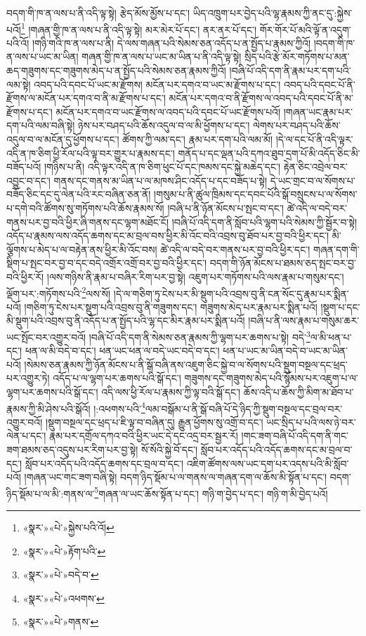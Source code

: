 བདག་གི་ཁ་ན་ལས་པ་ནི་འདི་ལྟ་སྟེ། རྩེད་མོས་མྱོས་པ་དང་། ཡིད་འཁྲུག་པར་བྱེད་པའི་ལྷ་རྣམས་ཀྱི་ནང་དུ་:སྐྱེས་པའོ།\footnote{«སྣར་»«པེ་»སྐྱེས་པའི་འོ།} །གཞན་གྱི་ཁ་ན་ལས་པ་ནི་འདི་ལྟ་སྟེ། མར་མེར་པོ་དང་། ནར་ནར་པོ་དང་། གོར་གོར་པོ་མའི་ལྟོ་ན་འདུག་པའི་འོ། །གཉི་གའི་ཁ་ན་ལས་པ་ནི། དེ་ལས་གཞན་པའི་སེམས་ཅན་འདོད་པ་ན་སྤྱོད་པ་རྣམས་ཀྱིའོ། །བདག་གི་ཁ་ན་ལས་པ་ཡང་མ་ཡིན། གཞན་གྱི་ཁ་ན་ལས་པ་ཡང་མ་ཡིན་པ་ནི་འདི་ལྟ་སྟེ། སྲིད་པའི་རྩེ་མོར་གཏོགས་པ་མན་ཆད་གཟུགས་དང་གཟུགས་མེད་པ་ན་སྤྱོད་པའི་སེམས་ཅན་རྣམས་ཀྱིའོ། །བཞི་པོ་འདི་དག་ནི་རྣམ་པར་དག་པའི་ལམ་སྟེ། འབད་པའི་དབང་པོ་ཡང་མ་རྫོགས། མངོན་པར་དགའ་བ་ཡང་མ་རྫོགས་པ་དང་། འབད་པའི་དབང་པོ་ནི་རྫོགས་ལ་མངོན་པར་དགའ་བ་ནི་མ་རྫོགས་པ་དང་། མངོན་པར་དགའ་བ་ནི་རྫོགས་ལ་འབད་པའི་དབང་པོ་ནི་མ་རྫོགས་པ་དང་། མངོན་པར་དགའ་བ་ཡང་རྫོགས་ལ་འབད་པའི་དབང་པོ་ཡང་རྫོགས་པའོ། །གཞན་ཡང་རྣམ་པར་དག་པའི་ལམ་བཞི་སྟེ། ཉེས་པར་བཤད་པའི་ཆོས་འདུལ་བ་ལ་མི་ཕྱོགས་པ་དང་། ལེགས་པར་བཤད་པའི་ཆོས་འདུལ་བ་ལ་མངོན་དུ་ཕྱོགས་པ་དང་། ཚོགས་ཀྱི་ལམ་དང་། རྣམ་པར་དག་པའི་ལམ་མོ། །དེ་ལ་དང་པོ་ནི་འདི་ལྟར་འདི་ན་ཁ་ཅིག་ཕྱི་རོལ་པའི་ལྟ་བར་གྱུར་པ་རྣམས་དང་། གནོད་པ་དང་ལྡན་པའི་དཀའ་ཐུབ་དྲག་པོ་མི་འདོད་ཅིང་མི་བཟོད་པའོ། །གཉིས་པ་ནི། འདི་ལྟར་འདི་ན་ཁ་ཅིག་ཕུང་པོ་དང་ཁམས་དང་སྐྱེ་མཆེད་དང་། རྟེན་ཅིང་འབྲེལ་བར་འབྱུང་བ་དང་། གནས་དང་གནས་མ་ཡིན་པ་ལ་མཁས་ཤིང་འདོད་པ་དང་བཟོད་པ་སྟེ། དེ་ཡང་གྲང་བ་ལ་སོགས་པ་བཟོད་ཅིང་དང་དུ་ལེན་པའི་རང་བཞིན་ཅན་ནོ། །གསུམ་པ་ནི་ཚུལ་ཁྲིམས་དང་དབང་པོའི་སྒོ་བསྲུངས་པ་ལ་སོགས་པ་དགེ་བའི་ཚོགས་སུ་གཏོགས་པའི་ཆོས་རྣམས་སོ། །བཞི་པ་ནི་ཉོན་མོངས་པ་སྤང་བ་དང་། ཚེ་འདི་ལ་བདེ་བར་གནས་པར་བྱ་བའི་ཕྱིར་ཞི་གནས་དང་ལྷག་མཐོང་ངོ། །བཞི་པོ་འདི་དག་ནི་སློབ་པའི་ལྷག་པའི་སེམས་ཀྱི་སྦྱོར་བ་སྟེ། འདོད་པ་རྣམས་ལས་འདོད་ཆགས་དང་མ་བྲལ་བས་ཕྱིར་མི་འོང་བའི་འབྲས་བུ་ཐོབ་པར་བྱ་བའི་ཕྱིར་དང་། མི་ལྕོགས་པ་མེད་པ་ལ་བརྟེན་ནས་ཕྱིར་མི་འོང་བས། ཚེ་འདི་ལ་བདེ་བར་གནས་པར་བྱ་བའི་ཕྱིར་དང་། གཞན་དག་གི་སྡིག་པ་སྤང་བར་བྱ་བ་དང་བདེ་འགྲོར་འགྲོ་བར་བྱ་བའི་ཕྱིར་དང་། བདག་གི་ཉོན་མོངས་པ་ཐམས་ཅད་སྤང་བར་བྱ་བའི་ཕྱིར་རོ། །ལས་གཉིས་ནི་རྣམ་པ་བཞིར་རིག་པར་བྱ་སྟེ། འཇུག་པར་གཏོགས་པའི་ལས་རྣམ་པ་གསུམ་དང་། ལྡོག་པར་:གཏོགས་པའི་\footnote{«སྣར་»«པེ་»རྟོག་པའི་}ལས་སོ། །དེ་ལ་གཅིག་ཏུ་ངེས་པར་མི་སྡུག་པའི་འབྲས་བུ་ནི་ངན་སོང་དུ་རྣམ་པར་སྨིན་པའོ། །གཅིག་ཏུ་ངེས་པར་སྡུག་པའི་འབྲས་བུ་ནི་གཟུགས་དང་། གཟུགས་མེད་པར་རྣམ་པར་སྨིན་པའོ། །སྡུག་པ་དང་མི་སྡུག་པའི་འབྲས་བུ་ནི་འདོད་པ་ན་སྤྱོད་པའི་ལྷ་དང་མིར་རྣམ་པར་སྨིན་པའོ། །བཞི་པ་ནི་ལས་རྣམ་པ་གསུམ་ཆར་ཡང་སྤོང་བར་འགྱུར་བའོ། །བཞི་པོ་འདི་དག་ནི་སེམས་ཅན་རྣམས་ཀྱི་ལྷག་པར་ཆགས་པ་སྟེ། བདེ་\footnote{«སྣར་»«པེ་»བདེ་བ་}ལ་མི་ཕན་པ་དང་། ཕན་ལ་མི་བདེ་བ་དང་། ཕན་ཡང་ཕན་ལ་བདེ་ཡང་བདེ་བ་དང་། ཕན་པ་ཡང་མ་ཡིན་བདེ་བ་ཡང་མ་ཡིན་པའོ། །སེམས་ཅན་རྣམས་ཀྱི་ཉོན་མོངས་པ་ནི་སྒོ་བཞི་ནས་འཇུག་ཅིང་སྐྱེ་བ་ལ་སོགས་པའི་སྡུག་བསྔལ་དང་ཕྲད་པར་འགྱུར་ཏེ། འདོད་པ་ལ་ལྷག་པར་ཆགས་པའི་སྒོ་དང་། གཟུགས་དང་གཟུགས་མེད་པའི་སྙོམས་པར་འཇུག་པ་ལ་ལྷག་པར་ཆགས་པའི་སྒོ་དང་། འདི་ལས་ཕྱི་རོལ་པ་རྣམས་ཀྱི་ལྟ་བའི་སྒོ་དང་། ཆོས་འདི་པ་ཆོས་ཀྱི་མིག་མ་ཐོབ་པ་རྣམས་ཀྱི་མི་ཤེས་པའི་སྒོའོ། །:འཕགས་པའི་\footnote{«སྣར་»«པེ་»འཕགས་}ལམ་བསྒོམ་པ་ནི་སྒོ་བཞི་པོ་དེ་ཉིད་ཀྱི་སྡུག་བསྔལ་དང་བྲལ་བར་འགྱུར་བའོ། །སྡུག་བསྔལ་དང་ཕྲད་པ་ཇི་ལྟ་བ་བཞིན་དུ། རྒྱུན་ཕྱོགས་སུ་འགྲོ་བ་དང་། ཡང་སྲིད་པ་པའི་ལས་ཉེ་བར་ལེན་པ་དང་། རྣམ་པར་དགྲོལ་དཀའ་བའི་ཕྱིར་ཡང་དེ་དང་འདྲ་བར་སྦྱར་རོ། །གང་ཟག་བཞི་པོ་འདི་དག་ནི་གང་ཟག་ཐམས་ཅད་འདུས་པར་རིག་པར་བྱ་སྟེ། སོ་སོའི་སྐྱེ་བོ་དང་། སློབ་པར་འདོད་པའི་འདོད་ཆགས་དང་མ་བྲལ་བ་དང་། སློབ་པར་འདོད་པའི་འདོད་ཆགས་དང་བྲལ་བ་དང་། འཇིག་ཚོགས་ལས་ཡང་དག་པར་འདས་པའི་མི་སློབ་པའོ། །གཞན་ཡང་གང་ཟག་བཞི་སྟེ། བདག་ཉིད་སྡོམ་པ་ལ་གནས་ལ་གཞན་དག་ལ་ཆོས་མི་སྟོན་པ་དང་། བདག་ཉིད་སྡོམ་པ་ལ་མི་:གནས་ལ་\footnote{«སྣར་»«པེ་»གནས་}གཞན་ལ་ཡང་ཆོས་སྟོན་པ་དང་། གཉི་ག་བྱེད་པ་དང་། གཉི་ག་མི་བྱེད་པའོ། 